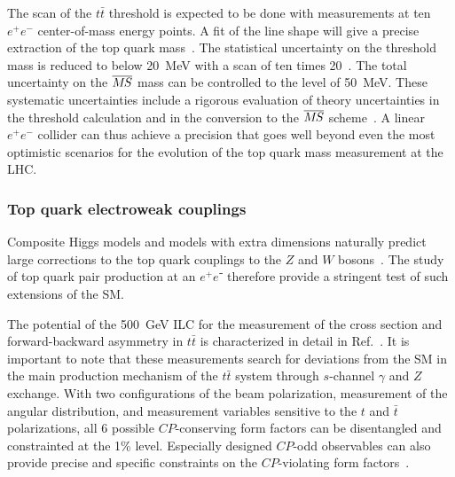 The scan of the $t\bar t$ threshold is expected to be done with
measurements at ten $e^+e^-$
center-of-mass energy points. A fit of the line shape will give
a precise extraction of the top quark mass~\cite{Martinez:2002st,Horiguchi:2013wra,Seidel:2013sqa}.
The statistical uncertainty on the threshold mass is reduced to below 20~MeV with a scan of
ten times 20~\ifb. The total uncertainty on the $\msb$ mass can be controlled to the level
of 50~MeV.   These systematic uncertainties
include a rigorous evaluation of theory uncertainties in the threshold calculation and in the conversion
to the $\msb$ scheme~\cite{Simon:2016pwp}. A linear $e^+e^-$ collider
can thus achieve a precision that goes well beyond
even the most optimistic scenarios for the evolution 
of the top quark mass measurement at the LHC.


\subsubsection{Top quark electroweak couplings}
\label{subsubsec:highE:topelectroweak}

Composite Higgs models and models with extra dimensions naturally
predict  large corrections to the top quark couplings to the $Z$ and
$W$ bosons~\cite{Richard:2014upa,Barducci:2015aoa,Durieux:2018ekg}.
The study of top quark pair production at an $e^+e⁻$ therefore provide
a stringent test of such extensions of the SM.

The potential of the 500~GeV ILC for the measurement of the cross section and forward-backward asymmetry in
$t\bar{t}$ is characterized in detail in Ref.~\cite{Amjad:2015mma}. It
is important to note that these measurements search for deviations
from the SM in the main production mechanism of the $t\bar t$ system
through $s$-channel $\gamma$ and $Z$ exchange.   With two
configurations of the beam polarization, measurement of the angular
distribution, and measurement variables sensitive to the $t$ and $\bar
t$ polarizations, all 6 possible $CP$-conserving form factors can be
disentangled and constrainted at the 1\% level. 
Especially designed $CP$-odd observables can also provide precise and
specific constraints on the $CP$-violating form factors~\cite{Bernreuther:2017cyi}. 

